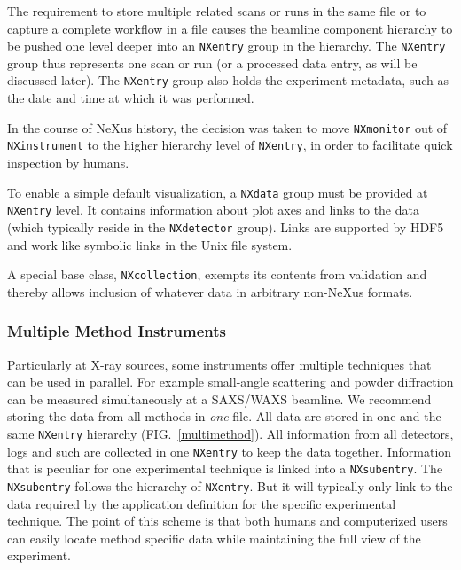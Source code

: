 \documentclass[%
 aip,
rsi,
 amsmath,amssymb,
 reprint,%
]{revtex4-1}
\begin{document}
The requirement to store multiple related scans or runs  in the same file or to capture 
a complete workflow in a file causes the beamline component hierarchy to be pushed one level deeper into an \texttt{NXentry} 
group in the hierarchy. The \texttt{NXentry}  group thus represents one scan or run (or a processed data entry, as will be discussed later). 
The \texttt{NXentry} group also holds the experiment metadata, such as the date and time at which it was performed. 

In the course of NeXus history,
the decision was taken to move \texttt{NXmonitor}
out of \texttt{NXinstrument} to the higher hierarchy level of \texttt{NXentry},
in order to facilitate quick inspection by humans.

To enable a simple default visualization,
a \texttt{NXdata} group must be provided at \texttt{NXentry} level.
It contains information about plot axes and links to the data
(which typically reside in the \texttt{NXdetector} group).
Links are supported by HDF5 and work like symbolic links in the Unix file system.

A special base class, \texttt{NXcollection}, exempts its contents from validation
and thereby allows inclusion of whatever data in arbitrary non-NeXus formats.

\subsubsection{Multiple Method Instruments}

Particularly at X-ray sources,
some instruments offer multiple techniques that can be used in parallel.
For example small-angle scattering and powder diffraction 
can be measured simultaneously at a SAXS/WAXS beamline.
We recommend storing the data from all methods in \emph{one} file.
All data are stored in one and the same \texttt{NXentry} hierarchy
(FIG.~\ref{multimethod}). All information from all detectors, logs and 
such are collected in one \texttt{NXentry} to keep the data together.
Information that is peculiar for one experimental technique
is linked  into a \texttt{NXsubentry}. The \texttt{NXsubentry} follows the hierarchy of 
\texttt{NXentry}. But it will typically only link to the data required by the 
application definition for the specific experimental technique. The point of this scheme 
is that both humans and computerized users can easily locate method specific data while 
maintaining the full view of the experiment.   
\end{document}
